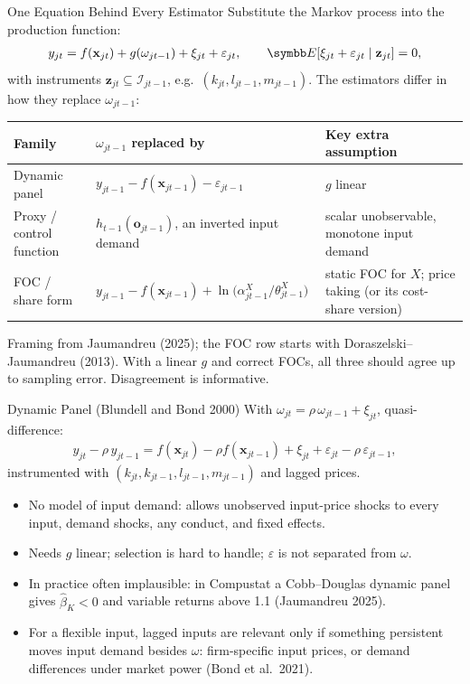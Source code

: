 \documentclass[aspectratio=169,10pt]{beamer}
\begin{document}
\begin{frame}{One Equation Behind Every Estimator}
Substitute the Markov process into the production function:
\begin{align*}
y_{jt} = f(\mathbf{x}_{jt}) + g(\omega_{jt-1}) + \xi_{jt} + \varepsilon_{jt}, \qquad \E[\xi_{jt} + \varepsilon_{jt} \mid \mathbf{z}_{jt}] = 0,
\end{align*}
with instruments $\mathbf{z}_{jt} \subseteq \mathcal{I}_{jt-1}$, e.g.\ $(k_{jt}, l_{jt-1}, m_{jt-1})$. The estimators differ in how they \alert{replace $\omega_{jt-1}$}:
\vspace{0.5em}

\small
\renewcommand{\arraystretch}{1.3}
\begin{tabularx}{\textwidth}{@{}l l X@{}}
\toprule
Family & $\omega_{jt-1}$ replaced by & Key extra assumption \\
\midrule
Dynamic panel & $y_{jt-1} - f(\mathbf{x}_{jt-1}) - \varepsilon_{jt-1}$ & $g$ linear \\
Proxy / control function & $h_{t-1}(\mathbf{o}_{jt-1})$, an inverted input demand & scalar unobservable, monotone input demand \\
FOC / share form & $y_{jt-1} - f(\mathbf{x}_{jt-1}) + \ln\big(\alpha^X_{jt-1}/\theta^X_{jt-1}\big)$ & static FOC for $X$; price taking (or its cost-share version) \\
\bottomrule
\end{tabularx}
\vspace{0.5em}

\normalsize
Framing from Jaumandreu (2025); the FOC row starts with Doraszelski--Jaumandreu (2013). With a linear $g$ and correct FOCs, all three should agree up to sampling error. Disagreement is informative.
\end{frame}


\begin{frame}{Dynamic Panel (Blundell and Bond 2000)}
With $\omega_{jt} = \rho\,\omega_{jt-1} + \xi_{jt}$, quasi-difference:
\begin{align*}
y_{jt} - \rho\, y_{jt-1} = f(\mathbf{x}_{jt}) - \rho f(\mathbf{x}_{jt-1}) + \xi_{jt} + \varepsilon_{jt} - \rho\,\varepsilon_{jt-1},
\end{align*}
instrumented with $(k_{jt}, k_{jt-1}, l_{jt-1}, m_{jt-1})$ and lagged prices.
\begin{itemize}
\item \cmark No model of input demand: allows unobserved input-price shocks to every input, demand shocks, any conduct, and fixed effects.
\item \xmark Needs $g$ linear; selection is hard to handle; $\varepsilon$ is not separated from $\omega$.
\item \xmark In practice often implausible: in Compustat a Cobb--Douglas dynamic panel gives $\hat\beta_K < 0$ and variable returns above 1.1 (Jaumandreu 2025).
\item For a flexible input, lagged inputs are relevant only if something persistent moves input demand besides $\omega$: firm-specific input prices, or demand differences under market power (Bond et al.\ 2021).
\end{itemize}
\end{frame}
\end{document}
